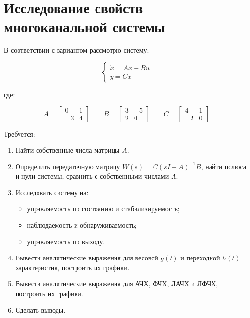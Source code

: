 \documentclass[a4paper,12pt]{article}
\begin{document}
	\newpage
	\tableofcontents
	
	\newpage \section{Исследование свойств многоканальной системы}\label{sec:1}
	
	В соответствии с вариантом рассмотрю систему:
	
		\begin{equation}
		\begin{cases}
			\dot{x} = Ax + Bu \\
			y = C x
		\end{cases}
		\label{sys}
	\end{equation}
	
	где:
	
	\[
	A = \begin{bmatrix} 
		0 & 1  \\ 
		-3 & 4 
	\end{bmatrix} \qquad
	B = \begin{bmatrix} 
		3 & -5  \\ 
		2 & 0 
	\end{bmatrix}\qquad
	C = \begin{bmatrix} 
		4 & 1  \\ 
		-2 & 0 
	\end{bmatrix}
	\]

	
	Требуется:
	\begin{enumerate}
		\item Найти собственные числа матрицы $A$.
		
		\item Определить передаточную матрицу $W(s) = C(sI - A)^{-1}B$, найти полюса и нули системы, сравнить с собственными числами $A$.
		
		\item Исследовать систему на:
		\begin{itemize}
			\item управляемость по состоянию и стабилизируемость;
			\item наблюдаемость и обнаруживаемость;
			\item управляемость по выходу.
		\end{itemize}
		
		\item Вывести аналитические выражения для весовой $g(t)$ и переходной $h(t)$ характеристик, построить их графики.
		
		\item Вывести аналитические выражения для АЧХ, ФЧХ, ЛАЧХ и ЛФЧХ, построить их графики.
		
		\item Сделать выводы.
	\end{enumerate}
	
\end{document}
